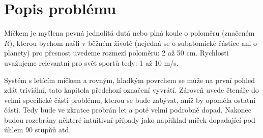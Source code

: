 \chapter{Popis problému}
\label{sec:popis-problemu}

Míčkem je myšlena pevná jednolitá dutá nebo plná koule o poloměru (značeném
$R$), kterou bychom našli v běžném životě (nejedná se o subatomické částice ani
o planety) pro přesnost uvedeme rozmezí poloměru: 2 až 50 cm. Rychlosti
uvažujeme relevantní pro svět sportů tedy: 1 až 10 m/s.

Systém s letícím míčkem a rovným, hladkým povrchem se může na první pohled zdát
triviální, tato kapitola předchozí označení vyvrátí. Zároveň uvede čtenáře do
velmi specifické části problému, kterou se bude zabývat, aniž by opoměla ostatní
části. Tedy bude ve zkratce probrán let a poté velmi podrobně dopad. Nakonec
budou rozebrány některé intuitivní případy jako například míček dopadající pod
úhlem 90 stupňů atd.




